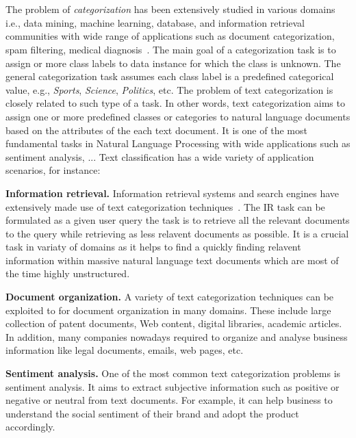 \section*{}
The problem of \textit{categorization} has been extensively studied in various domains i.e., data mining, machine learning, database, and information retrieval communities with wide range of applications such as document categorization, spam filtering, medical diagnosis~\cite{book_survey_text_class_algorithms}. The main goal of a categorization task is to assign or more class labels to data instance for which the class is unknown. The general categorization task assumes each class label is a predefined categorical value, e.g., \textit{Sports}, \textit{Science}, \textit{Politics}, etc. The problem of text categorization is closely related to such type of a task. In other words, text categorization aims to assign one or more predefined classes or categories to natural language documents based on the attributes of the each text document. It is one of the most fundamental tasks in Natural Language Processing with wide applications such as sentiment analysis, ... %
Text classification
has a wide variety of application scenarios, for instance: \newline%

\textbf{Information retrieval.}
Information retrieval systems and search engines have extensively made use of text categorization techniques~\cite{survey}. The IR task can be formulated as a given user query the task is to retrieve all the relevant documents to the query while retrieving as less relavent documents as possible. It is a crucial task in variaty of domains as it helps to find a quickly finding relavent information within massive natural language text documents which are most of the time highly unstructured. 


\textbf{Document organization.}
A variety of text categorization techniques can be exploited to for document organization in many domains. These include large collection of patent documents, Web content, digital libraries, academic articles. In addition, many companies nowadays required to organize and analyse business information like legal documents, emails, web pages, etc. 

\textbf{Sentiment analysis.}
One of the most common text categorization problems is sentiment analysis. It aims to extract subjective information such as positive or negative or neutral from text documents. For example, it can help business to understand the social sentiment of their brand and adopt the product accordingly.  

